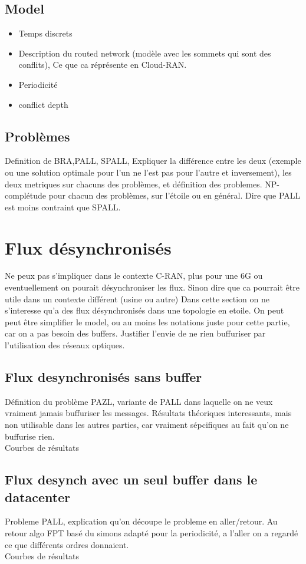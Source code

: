 \documentclass[a4paper,10pt]{article}
\begin{document}
\subsection{Model}
\begin{itemize}
 \item Temps discrets
 \item Description du routed network (modèle avec les sommets qui sont des conflits), Ce que ca réprésente en Cloud-RAN.
 \item Periodicité
 \item conflict depth
 
\end{itemize}
\subsection{Problèmes}
Definition de BRA,PALL, SPALL, Expliquer la différence entre les deux (exemple ou une solution optimale pour l'un ne l'est pas pour l'autre et inversement), les deux metriques sur chacuns des problèmes, et définition des problemes. NP-complétude pour chacun des problèmes, sur l'étoile ou en général.
Dire que PALL est moins contraint que SPALL.


\section{Flux désynchronisés}
Ne peux pas s'impliquer dans le contexte C-RAN, plus pour une 6G ou eventuellement on pourait désynchroniser les flux. Sinon dire que ca pourrait être utile dans un contexte différent (usine ou autre)
Dans cette section on ne s'interesse qu'a des flux désynchronisés dans une topologie en etoile.
On peut peut être simplifier le model, ou au moins les notations juste pour cette partie, car on a pas besoin  des buffers.
Justifier l'envie de ne rien buffuriser par l'utilisation des réseaux optiques.
\subsection{Flux desynchronisés sans buffer}
Définition du problème PAZL, variante de PALL dans laquelle on ne veux vraiment jamais buffuriser les messages.
Résultats théoriques interessants, mais non utilisable dans les autres parties, car vraiment sépcifiques au fait qu'on ne buffurise rien.\\
Courbes de résultats
\subsection{Flux desynch avec un seul buffer dans le datacenter}
Probleme PALL, explication qu'on découpe le probleme en aller/retour.
Au retour algo FPT basé du simons adapté pour la periodicité, a l'aller on a regardé ce que différents ordres donnaient.\\
Courbes de résultats
\end{document}
